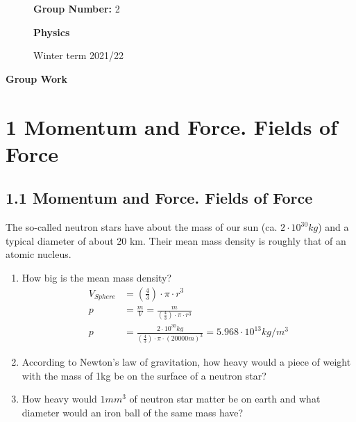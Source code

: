 \documentclass[10pt,ngerman]{scrartcl}
\begin{document}
\begin{figure}[htbp]
\begin{minipage}[b]{0.50\linewidth}
\begin{Large}
	\textbf{Group Number:} 2\newline\newline
\end{Large}
\end{minipage}
\begin{minipage}[b]{0.50\linewidth}
\begin{flushright}
\begin{Huge}
\textbf{Physics}\\
\end{Huge}
\vspace{0.5cm}
\begin{large}
Winter term 2021/22
\end{large}
\end{flushright}
\end{minipage}
\end{figure}

\vspace{2cm}
\begin{huge}
\noindent

\textbf{Group Work}
\end{huge}

\section{1 Momentum and Force. Fields of Force}
\subsection{1.1 Momentum and Force. Fields of Force}
The so-called neutron stars have about the mass of our sun (ca. $2 \cdot 10^{30}kg$) and a typical diameter of about 20 km. Their mean mass density is roughly that of an atomic nucleus.
\begin{enumerate}
	\item How big is the mean mass density?
	\begin{align*}
		V_{Sphere} &= (\frac{4}{3}) \cdot \pi \cdot r^3\\
		p &= \frac{m}{V} = \frac{m}{(\frac{4}{3}) \cdot \pi \cdot r^3}\\
		p &= \frac{2 \cdot 10^{30}kg}{(\frac{4}{3}) \cdot \pi \cdot (20000m)^3} = 5.968 \cdot 10^{13} kg/m^3
	\end{align*}
	\item According to Newton's law of gravitation, how heavy would a piece of weight with the mass of 1kg be on the surface of a neutron star?
	\item How heavy would $1mm^3$ of neutron star matter be on earth and what diameter would an iron ball of the same mass have?
\end{enumerate}
\end{document}
